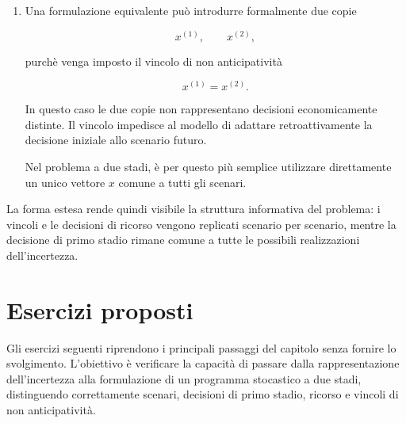 \begin{enumerate}
Ci\`o significherebbe utilizzare al primo stadio un'informazione che diventa
disponibile soltanto al secondo stadio. La formulazione violerebbe quindi il
principio di non anticipativit\`a.

La decisione iniziale deve essere assunta prima di conoscere lo scenario e
deve pertanto essere unica:

\[
x^{(1)}
=
x^{(2)}
=
x.
\]

\item Una formulazione equivalente pu\`o introdurre formalmente due copie

\[
x^{(1)},
\qquad
x^{(2)},
\]

purch\`e venga imposto il vincolo di non anticipativit\`a

\[
x^{(1)}
=
x^{(2)}.
\]

In questo caso le due copie non rappresentano decisioni economicamente
distinte. Il vincolo impedisce al modello di adattare retroattivamente la
decisione iniziale allo scenario futuro.

Nel problema a due stadi, \`e per questo pi\`u semplice utilizzare direttamente
un unico vettore $x$ comune a tutti gli scenari.

\end{enumerate}

La forma estesa rende quindi visibile la struttura informativa del problema:
i vincoli e le decisioni di ricorso vengono replicati scenario per scenario,
mentre la decisione di primo stadio rimane comune a tutte le possibili
realizzazioni dell'incertezza.

\section{Esercizi proposti}

\label{sec:cap14-esercizi-proposti}

Gli esercizi seguenti riprendono i principali passaggi del capitolo senza
fornire lo svolgimento. L'obiettivo \`e verificare la capacit\`a di passare
dalla rappresentazione dell'incertezza alla formulazione di un programma
stocastico a due stadi, distinguendo correttamente scenari, decisioni di
primo stadio, ricorso e vincoli di non anticipativit\`a.


